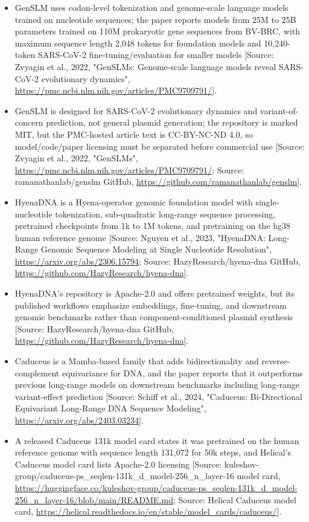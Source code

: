 \documentclass[11pt]{report}
\begin{document}
\begin{itemize}
\item GenSLM uses codon-level tokenization and genome-scale language models trained on nucleotide sequences; the paper reports models from 25M to 25B parameters trained on 110M prokaryotic gene sequences from BV-BRC, with maximum sequence length 2,048 tokens for foundation models and 10,240-token SARS-CoV-2 fine-tuning/evaluation for smaller models [Source: Zvyagin et al., 2022, "GenSLMs: Genome-scale language models reveal SARS-CoV-2 evolutionary dynamics", \url{https://pmc.ncbi.nlm.nih.gov/articles/PMC9709791/}].
\item GenSLM is designed for SARS-CoV-2 evolutionary dynamics and variant-of-concern prediction, not general plasmid generation; the repository is marked MIT, but the PMC-hosted article text is CC-BY-NC-ND 4.0, so model/code/paper licensing must be separated before commercial use [Source: Zvyagin et al., 2022, "GenSLMs", \url{https://pmc.ncbi.nlm.nih.gov/articles/PMC9709791/}; Source: ramanathanlab/genslm GitHub, \url{https://github.com/ramanathanlab/genslm}].
\item HyenaDNA is a Hyena-operator genomic foundation model with single-nucleotide tokenization, sub-quadratic long-range sequence processing, pretrained checkpoints from 1k to 1M tokens, and pretraining on the hg38 human reference genome [Source: Nguyen et al., 2023, "HyenaDNA: Long-Range Genomic Sequence Modeling at Single Nucleotide Resolution", \url{https://arxiv.org/abs/2306.15794}; Source: HazyResearch/hyena-dna GitHub, \url{https://github.com/HazyResearch/hyena-dna}].
\item HyenaDNA's repository is Apache-2.0 and offers pretrained weights, but its published workflows emphasize embeddings, fine-tuning, and downstream genomic benchmarks rather than component-conditioned plasmid synthesis [Source: HazyResearch/hyena-dna GitHub, \url{https://github.com/HazyResearch/hyena-dna}].
\item Caduceus is a Mamba-based family that adds bidirectionality and reverse-complement equivariance for DNA, and the paper reports that it outperforms previous long-range models on downstream benchmarks including long-range variant-effect prediction [Source: Schiff et al., 2024, "Caduceus: Bi-Directional Equivariant Long-Range DNA Sequence Modeling", \url{https://arxiv.org/abs/2403.03234}].
\item A released Caduceus 131k model card states it was pretrained on the human reference genome with sequence length 131,072 for 50k steps, and Helical's Caduceus model card lists Apache-2.0 licensing [Source: kuleshov-group/caduceus-ps\_seqlen-131k\_d\_model-256\_n\_layer-16 model card, \url{https://huggingface.co/kuleshov-group/caduceus-ps_seqlen-131k_d_model-256_n_layer-16/blob/main/README.md}; Source: Helical Caduceus model card, \url{https://helical.readthedocs.io/en/stable/model_cards/caduceus/}].

\end{itemize}
\end{document}
